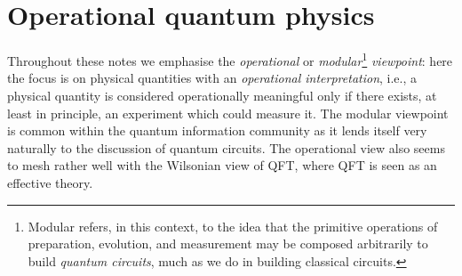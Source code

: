 \documentclass[11pt]{amsart}
\theoremstyle{plain}%
\theoremstyle{definition}
\theoremstyle{remark}
\begin{document}
\section{Operational quantum physics}\label{sec:opqp}
Throughout these notes we emphasise the \emph{operational} or \emph{modular}\footnote{Modular refers, in this context, to the idea that the primitive operations of preparation, evolution, and measurement may be composed arbitrarily to build \emph{quantum circuits}, much as we do in building classical circuits.} \emph{viewpoint}: here the focus is on physical quantities with an \emph{operational interpretation}, i.e., a physical quantity is considered operationally meaningful only if there exists, at least in principle, an experiment which could measure it. The modular viewpoint is common within the quantum information community as it lends itself very naturally to the discussion of quantum circuits. The operational view also seems to mesh rather well with the Wilsonian view of QFT, where QFT is seen as an effective theory.
\end{document}
